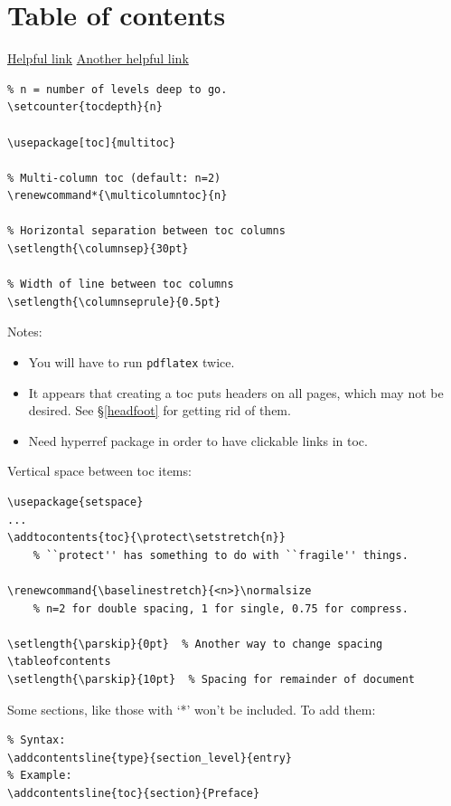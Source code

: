 \documentclass{article}
\renewcommand*{\multicolumntoc}{2}
\begin{document}
\newpage
\section{Table of contents}\label{contents}%

\href{http://texblog.org/2011/09/09/10-ways-to-customize-tocloflot/}{Helpful link}
\href{http://tex.stackexchange.com/questions/37940/table-of-contents-with-roman-arabic-and-no-page-numbers}
{Another helpful link}

\begin{lstlisting}
% n = number of levels deep to go.
\setcounter{tocdepth}{n}

\usepackage[toc]{multitoc}

% Multi-column toc (default: n=2)
\renewcommand*{\multicolumntoc}{n}

% Horizontal separation between toc columns
\setlength{\columnsep}{30pt}

% Width of line between toc columns
\setlength{\columnseprule}{0.5pt}
\end{lstlisting}

Notes:
\begin{itemize}
    \item You will have to run \texttt{pdflatex} twice.
    \item It appears that creating a toc puts headers on all pages, which may
        not be desired. See \S{}\ref{headfoot} for getting rid of them.
    \item Need hyperref package in order to have clickable links in toc.
\end{itemize}

Vertical space between toc items:
\begin{lstlisting}
\usepackage{setspace}
...
\addtocontents{toc}{\protect\setstretch{n}}
    % ``protect'' has something to do with ``fragile'' things.

\renewcommand{\baselinestretch}{<n>}\normalsize
    % n=2 for double spacing, 1 for single, 0.75 for compress.

\setlength{\parskip}{0pt}  % Another way to change spacing
\tableofcontents
\setlength{\parskip}{10pt}  % Spacing for remainder of document
\end{lstlisting}

Some sections, like those with `*' won't be included. To add them:
\begin{lstlisting}
% Syntax:
\addcontentsline{type}{section_level}{entry}
% Example:
\addcontentsline{toc}{section}{Preface}
\end{lstlisting}
\end{document}
